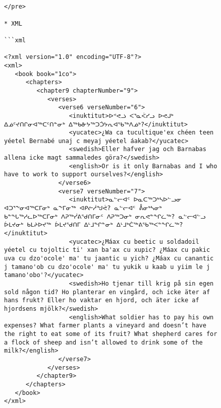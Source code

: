 \documentclass[12pt]{article}
\begin{document}
\begin{figure}
\begin{verbatim}


</pre>

* XML

```xml

<?xml version="1.0" encoding="UTF-8"?>
<xml>
   <book book="1co">
      <chapters>
         <chapter9 chapterNumber="9">
            <verses>
               <verse6 verseNumber="6">
                  <inuktitut>ᐅᕝᕙᓘ ᐸᕐᓇᐹᓯᓗ ᐅᕙᒍᒃ ᐃᓅᑦᔪᑎᒋᓂᐊᖅᑕᑦᑎᓐᓂᒃ ᐃᖅᑲᓁᔭᖅᑐᑑᔭᕆᐊᖃᖅᐱᓅᒃ?</inuktitut>
                  <yucatec>¿Wa ca tucultique'ex chéen teen yéetel Bernabé unaj c meyaj yéetel áakab?</yucatec>
                  <swedish>Eller hafver jag och Barnabas allena icke magt sammaledes göra?</swedish>
                  <english>Or is it only Barnabas and I who have to work to support ourselves?</english>
               </verse6>
               <verse7 verseNumber="7">
                  <inuktitut>ᓇᓪᓕᐊᑦ ᐅᓇᑕᖅᑐᒃᓴᐅᓪᓗᓂ ᐊᑐᕐᖕᓂᐊᖅᑕᒥᓂᒃ ᓇᖕᒥᓂᖅ ᐊᑭᓖᓲᖑᕚ? ᓇᓪᓕᐊᑦ ᕔᓂᒃᓴᓂᒃ ᑲᓐᖓᖅᓱᓚᐅᖅᑕᒥᓂᒃ ᐱᕈᖅᓰᕕᖁᑎᒥᓂᑦ ᐱᕈᖅᑐᓂᒃ ᓂᕆᕙᓐᖏᓛᖅ? ᓇᓪᓕᐊᓪᓗ ᐆᒪᔪᓂᒃ ᑲᒪᔨᐅᔪᖅ ᐆᒪᔪᖁᑎᒥ ᐃᒻᒧᖏᓐᓂᒃ ᐃᒻᒧᒃᑖᖅᕕᖃᖅᐸᓐᖏᓛᖅ?</inuktitut>
                  <yucatec>¿Máax cu beetic u soldadoil yéetel cu tojoltic ti' xan ba'ax cu xupic? ¿Máax cu pakic uva cu dzo'ocole' ma' tu jaantic u yich? ¿Máax cu canantic j tamano'ob cu dzo'ocole' ma' tu yukik u kaab u yiim le j tamano'obo'?</yucatec>
                  <swedish>Ho tjenar till krig på sin egen sold någon tid? Ho planterar en vingård, och icke äter af hans frukt? Eller ho vaktar en hjord, och äter icke af hjordsens mjölk?</swedish>
                  <english>What soldier has to pay his own expenses? What farmer plants a vineyard and doesn’t have the right to eat some of its fruit? What shepherd cares for a flock of sheep and isn’t allowed to drink some of the milk?</english>
               </verse7>
            </verses>
         </chapter9>
      </chapters>
   </book>
</xml>

\end{verbatim}
\end{figure}
\end{document}
